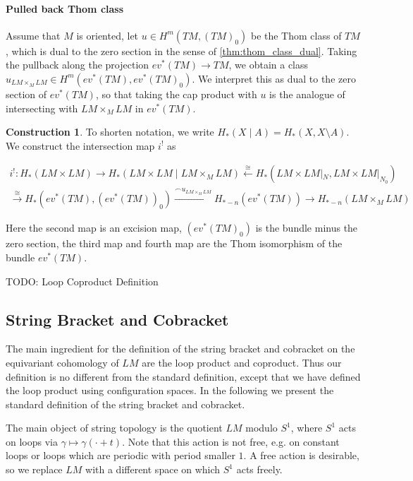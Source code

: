 \documentclass{scrartcl}
\theoremstyle{plain}
\theoremstyle{definition}
\newtheorem{construction}[theorem]{Construction}
\newcommand{\capp}{\mathbin{\frown}}
\newcommand{\iso}{\cong}
\let\xto\xrightarrow
\let\xfrom\xleftarrow
\begin{document}
\paragraph{Pulled back Thom class}

Assume that $M$ is oriented, let $u\in H^m(TM, (TM)_0)$ be the Thom class of $TM$, which is dual to the zero section in the sense of \ref{thm:thom_class_dual}. Taking the pullback along the projection $ev^*(TM)\to TM$, we obtain a class $u_{LM\times_M LM} \in H^m(ev^*(TM), ev^*(TM)_0)$. We interpret this as dual to the zero section of $ev^*(TM)$, so that taking the cap product with $u$ is the analogue of intersecting with  $LM\times_M LM$ in $ev^*(TM)$.


\begin{construction}\label{constr:loop-product-classical}
To shorten notation, we write $H_*(X \mid A) = H_*(X, X\setminus A)$. We construct the intersection map $i^!$ as 

\begin{align*}
    i^!\colon H_*(LM\times LM) \to H_*(LM\times LM \mid LM\times_M LM) \xfrom{\iso} H_*(LM\times LM |_N, LM\times LM|_{N_0}) \\ \xto{\iso} H_*(ev^*(TM), (ev^*(TM))_0) \xto{\capp u_{LM\times_M LM}} H_{*-n}(ev^*(TM)) \to H_{*-n}(LM\times_M LM)
\end{align*}

Here the second map is an excision map, $(ev^*(TM)_0)$ is the bundle minus the zero section, the third map and fourth map are the Thom isomorphism of the bundle $ev^*(TM)$.

\end{construction}

TODO: Loop Coproduct Definition

\subsection{String Bracket and Cobracket}
The main ingredient for the definition of the string bracket and cobracket on the equivariant cohomology of $LM$ are the loop product and coproduct. Thus our definition is no different from the standard definition, except that we have defined the loop product using configuration spaces. In the following we present the standard definition of the string bracket and cobracket.

The main object of string topology is the quotient $LM$ modulo $S^1$, where $S^1$ acts on loops via $\gamma\mapsto \gamma(\cdot + t)$. Note that this action is not free, e.g. on constant loops or loops which are periodic with period smaller $1$. A free action is desirable, so we replace $LM$ with a different space on which $S^1$ acts freely.
\end{document}
